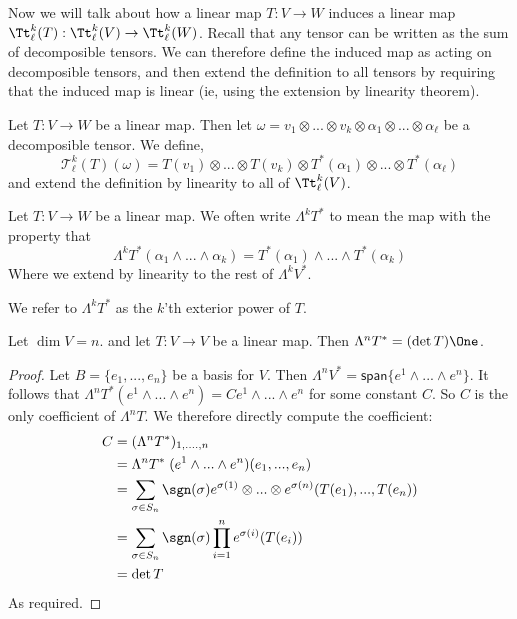 Now we will talk about how a linear map $T : V \to W$ induces a linear map $\Tt_\ell^k(T) : \Tt_\ell^k(V)\to \Tt_\ell^k(W)$. Recall that any tensor can be written as the sum of decomposible tensors. We can therefore define the induced map as acting on decomposible tensors, and then extend the definition to all tensors by requiring that the induced map is linear (ie, using the extension by linearity theorem). 
\begin{defn} Let $T : V \to W$ be a linear map. Then let $\omega=v_1\otimes...\otimes v_k \otimes \alpha_1\otimes...\otimes \alpha_\ell$ be a decomposible tensor. We define,
\[\mathcal{T}_\ell^k (T)(\omega) = T(v_1)\otimes...\otimes T(v_k)\otimes T^*(\alpha_1)\otimes...\otimes T^*(\alpha_\ell)\]
and extend the definition by linearity to all of $\Tt_\ell^k(V)$.
\end{defn}
\begin{defn}
    Let $T : V \to W$ be a linear map. We often write $\Lambda^k T^*$ to mean the map with the property that
    \[\Lambda^k T^*(\alpha_1\wedge...\wedge \alpha_k) = T^*(\alpha_1)\wedge...\wedge T^*(\alpha_k)\]
    Where we extend by linearity to the rest of $\Lambda^k V^*$.
\end{defn}

We refer to $\Lambda^k T^*$ as the $k$'th exterior power of $T$. 

\begin{thm}
Let $\dim V = n$. and let $T : V \to V$ be a linear map. Then $\Lambda^n T^* = (\det T)\One$. 
\end{thm}
\begin{proof}Let $B=\{e_1,...,e_n\}$ be a basis for $V$. Then $\Lambda^n V^* = \textsf{span}\{e^1\wedge...\wedge e^n\}$. It follows that $\Lambda^n T^*(e^1\wedge...\wedge e^n) = C e^1\wedge...\wedge e^n$ for some constant $C$. So $C$ is the only coefficient of $\Lambda^n T$. We therefore directly compute the coefficient:
\begin{align*}
C&=(\Lambda^n T^*)_{1,....,n}\\
&=\Lambda^n T^*\; (e^1\wedge...\wedge e^n)(e_1,...,e_n) \\
&= \sum_{\sigma \in S_n}\sgn(\sigma)e^{\sigma(1)}\otimes...\otimes e^{\sigma(n)}(T(e_1),...,T(e_n))\\
&= \sum_{\sigma \in S_n} \sgn(\sigma) \prod_{i=1}^n e^{\sigma(i)}(T(e_i))\\
&= \det T
\end{align*}
As required.
\end{proof}



